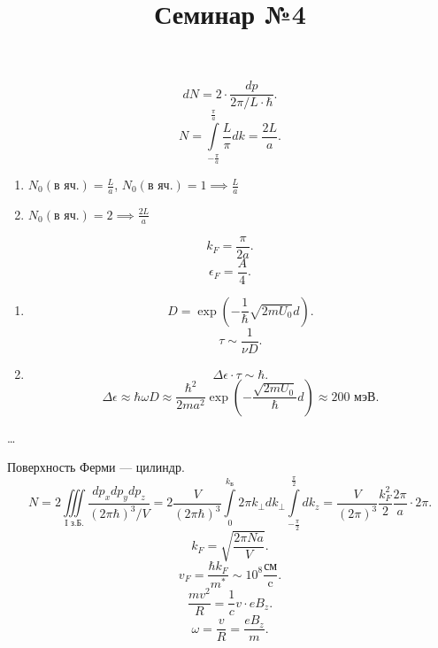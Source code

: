 \documentclass[a4paper]{article}
\title{Семинар №4}
\begin{document}
	\maketitle
\begin{hiProb}[0-4-1]
\end{hiProb}
\begin{sol}
\[
dN= 2\cdot \frac{dp}{2\pi /L \cdot \hbar}
.\] 
\[
N= \int\limits_{-\frac{\pi}{a}}^{\frac{\pi}{a}}  \frac{L}{\pi}dk=\frac{2L}{a}
.\] 
\renewcommand{\labelenumi}{\asbuk{enumi})}
\begin{enumerate}
	\item $\displaystyle N_0(\text{в яч.})=\frac{L}{a}$, $\displaystyle N_0(\text{в яч.})=1
		\implies \frac{L}{a}$ 
	\item $\displaystyle N_0(\text{в яч.})=2 \implies \frac{2L}{a}$
\end{enumerate}
\end{sol}
\begin{hiProb}[0-4-2]
\end{hiProb}
\begin{sol}
\[
k_F=\frac{\pi}{2a}
.\] 
\[
\epsilon_F=\frac{A}{4}
.\] 
\end{sol}
\begin{hiProb}[3.1]
\end{hiProb}
\begin{sol}
	\begin{enumerate}
	\item \[
	D= \exp \left( -\frac{1}{\hbar }\sqrt{2m U_0} d \right) 
.\] 
\[
\tau \sim  \frac{1}{\nu D}
.\]
\item \[
\Delta \epsilon \cdot \tau \sim \hbar
.\] 
\[
\Delta \epsilon \approx \hbar \omega D \approx \frac{\hbar^2}{2ma^2}
\exp\left( -\frac{\sqrt{2m U_0} }{\hbar }d \right) \approx 200 \text{ мэВ}
.\] 
	\end{enumerate}
 
\end{sol}
\begin{hiProb}[Т4]
\end{hiProb}
\begin{sol}
\ldots
\end{sol}
\begin{hiProb}[3.34]
\end{hiProb}
\begin{sol}
Поверхность Ферми --- цилиндр.
\[
	N=2 \iiint\limits_{\text{I з.Б.}}^{}  \frac{dp_x dp_y dp_z}{(
	2\pi \hbar)^3 /V}=2 \frac{V}{(2\pi \hbar)^3}\int\limits_{0}^{k_\text{Б}}2\pi k_\perp d k_\perp \int\limits_{-\frac{\pi}{2}}^{\frac{\pi}{2}} dk_z= \frac{V}{(2\pi)^3} \frac{k_F^2}{2} \frac{2\pi}{a}
	\cdot 2\pi
.\] 
\[
	k_F= \sqrt{ \frac{2\pi Na}{V}} 
.\] 
\[
v_F= \frac{\hbar k_F}{m^*}\sim  10^8 \frac{\text{см}}{\text{c}}
.\] 
\[
\frac{mv^2}{R}=\frac{1}{c} v\cdot eB_z
.\] 
\[
	\omega= \frac{v}{R}= \frac{eB_z}{m}
.\] 
\end{sol}
\end{document}
